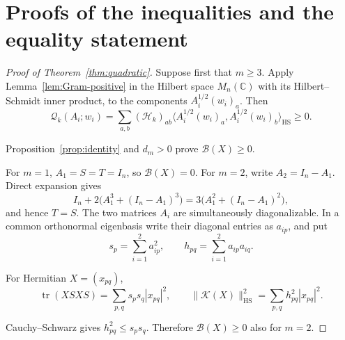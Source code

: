 \documentclass[11pt]{article}
\newcommand{\tr}{\operatorname{tr}}
\newcommand{\HS}{\mathrm{HS}}
\newcommand{\Id}{I_n}
\newcommand{\cK}{\mathcal K}
\newcommand{\cB}{\mathcal B}
\newcommand{\gH}{\mathscr H}
\newcommand{\gQ}{\mathscr Q}
\newcommand{\ip}[2]{\langle #1,#2\rangle}
\newcommand{\nrm}[1]{\lVert #1\rVert}
\begin{document}
\section{Proofs of the inequalities and the equality statement}

\begin{proof}[Proof of Theorem~\ref{thm:quadratic}]
Suppose first that \(m\ge3\).
Apply Lemma~\ref{lem:Gram-positive} in the Hilbert space
\(M_n(\mathbb C)\) with its Hilbert--Schmidt inner product, to the
components \(A_i^{1/2}(w_i)_a\). Then
\[
 \gQ_k(A_i;w_i)
 =\sum_{a,b}(\gH_k)_{ab}
       \ip{A_i^{1/2}(w_i)_a}{A_i^{1/2}(w_i)_b}_{\HS}\ge0.
\]

Proposition~\ref{prop:identity} and \(d_m>0\) prove \(\cB(X)\ge0\).

For \(m=1\), \(A_1=S=T=\Id\), so \(\cB(X)=0\).
For \(m=2\), write \(A_2=\Id-A_1\). Direct expansion gives
\[
 \Id+2\bigl(A_1^3+(\Id-A_1)^3\bigr)
 =3\bigl(A_1^2+(\Id-A_1)^2\bigr),
\]
and hence \(T=S\). The two matrices \(A_i\) are simultaneously
diagonalizable. In a common orthonormal eigenbasis write their
diagonal entries as \(a_{ip}\), and put
\[
 s_p=\sum_{i=1}^2a_{ip}^2,\qquad
 h_{pq}=\sum_{i=1}^2a_{ip}a_{iq}.
\]

For Hermitian \(X=(x_{pq})\),
\[
 \tr(XSXS)=\sum_{p,q}s_ps_q|x_{pq}|^2,\qquad
 \nrm{\cK(X)}_{\HS}^2=\sum_{p,q}h_{pq}^2|x_{pq}|^2.
\]

Cauchy--Schwarz gives \(h_{pq}^2\le s_ps_q\).
Therefore \(\cB(X)\ge0\) also for \(m=2\).
\end{proof}
\end{document}
